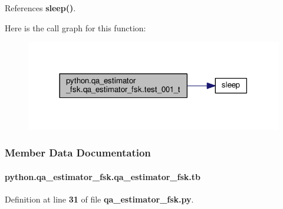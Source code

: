 References {\bf sleep()}.



Here is the call graph for this function\+:
\nopagebreak
\begin{figure}[H]
\begin{center}
\leavevmode
\includegraphics[width=318pt]{dc/d32/classpython_1_1qa__estimator__fsk_1_1qa__estimator__fsk_ab8dcf9abe228c5aa40aadef63ecff0ff_cgraph}
\end{center}
\end{figure}




\subsubsection{Member Data Documentation}
\paragraph[{tb}]{\setlength{\rightskip}{0pt plus 5cm}python.\+qa\+\_\+estimator\+\_\+fsk.\+qa\+\_\+estimator\+\_\+fsk.\+tb}\label{classpython_1_1qa__estimator__fsk_1_1qa__estimator__fsk_a77c80e6fead63a9790f5f2f2a8079c60}


Definition at line {\bf 31} of file {\bf qa\+\_\+estimator\+\_\+fsk.\+py}.



